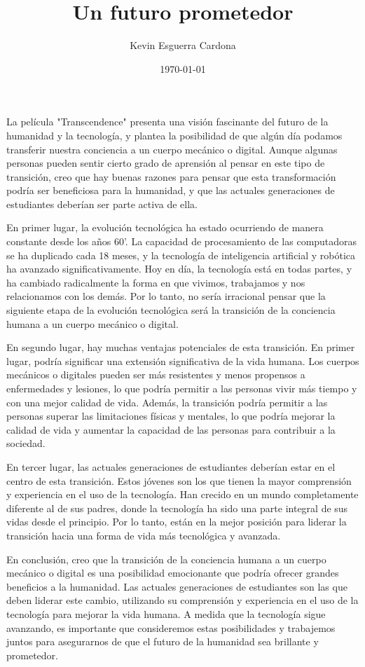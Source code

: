 \documentclass[12pt]{article}
\title{Un futuro prometedor}
\author{Kevin Esguerra Cardona}
\date{\today}
\begin{document}
\maketitle

La película "Transcendence" presenta una visión fascinante del futuro de la humanidad y la tecnología, y plantea la posibilidad de que algún día podamos transferir nuestra conciencia a un cuerpo mecánico o digital. Aunque algunas personas pueden sentir cierto grado de aprensión al pensar en este tipo de transición, creo que hay buenas razones para pensar que esta transformación podría ser beneficiosa para la humanidad, y que las actuales generaciones de estudiantes deberían ser parte activa de ella.

En primer lugar, la evolución tecnológica ha estado ocurriendo de manera constante desde los años 60'. La capacidad de procesamiento de las computadoras se ha duplicado cada 18 meses, y la tecnología de inteligencia artificial y robótica ha avanzado significativamente. Hoy en día, la tecnología está en todas partes, y ha cambiado radicalmente la forma en que vivimos, trabajamos y nos relacionamos con los demás. Por lo tanto, no sería irracional pensar que la siguiente etapa de la evolución tecnológica será la transición de la conciencia humana a un cuerpo mecánico o digital.

En segundo lugar, hay muchas ventajas potenciales de esta transición. En primer lugar, podría significar una extensión significativa de la vida humana. Los cuerpos mecánicos o digitales pueden ser más resistentes y menos propensos a enfermedades y lesiones, lo que podría permitir a las personas vivir más tiempo y con una mejor calidad de vida. Además, la transición podría permitir a las personas superar las limitaciones físicas y mentales, lo que podría mejorar la calidad de vida y aumentar la capacidad de las personas para contribuir a la sociedad.

En tercer lugar, las actuales generaciones de estudiantes deberían estar en el centro de esta transición. Estos jóvenes son los que tienen la mayor comprensión y experiencia en el uso de la tecnología. Han crecido en un mundo completamente diferente al de sus padres, donde la tecnología ha sido una parte integral de sus vidas desde el principio. Por lo tanto, están en la mejor posición para liderar la transición hacia una forma de vida más tecnológica y avanzada.

En conclusión, creo que la transición de la conciencia humana a un cuerpo mecánico o digital es una posibilidad emocionante que podría ofrecer grandes beneficios a la humanidad. Las actuales generaciones de estudiantes son las que deben liderar este cambio, utilizando su comprensión y experiencia en el uso de la tecnología para mejorar la vida humana. A medida que la tecnología sigue avanzando, es importante que consideremos estas posibilidades y trabajemos juntos para asegurarnos de que el futuro de la humanidad sea brillante y prometedor.
\end{document}
